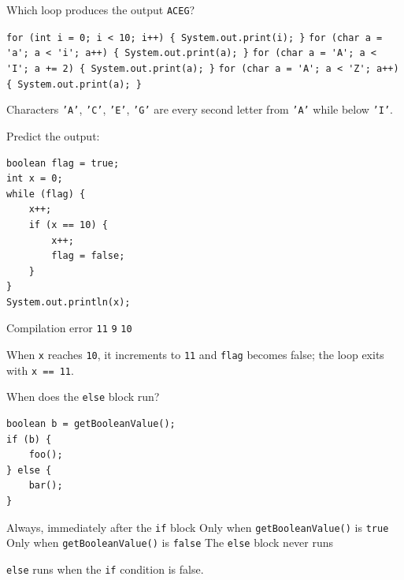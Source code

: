 \newpage

\question[4]
Which loop produces the output \lstinline!ACEG!?
\begin{choices}
  \choice \lstinline!for (int i = 0; i < 10; i++) { System.out.print(i); }!
  \choice \lstinline!for (char a = 'a'; a < 'i'; a++) { System.out.print(a); }!
  \CorrectChoice \lstinline!for (char a = 'A'; a < 'I'; a += 2) { System.out.print(a); }!
  \choice \lstinline!for (char a = 'A'; a < 'Z'; a++) { System.out.print(a); }!
\end{choices}
\begin{solution}
  Characters \texttt{'A'}, \texttt{'C'}, \texttt{'E'}, \texttt{'G'} are every second letter from \texttt{'A'} while below \texttt{'I'}.
\end{solution}

\question[4]
Predict the output:
\begin{lstlisting}[style=java]
boolean flag = true;
int x = 0;
while (flag) {
    x++;
    if (x == 10) {
        x++;
        flag = false;
    }
}
System.out.println(x);
\end{lstlisting}
\begin{choices}
  \choice Compilation error
  \CorrectChoice \texttt{11}
  \choice \texttt{9}
  \choice \texttt{10}
\end{choices}
\begin{solution}
  When \texttt{x} reaches \texttt{10}, it increments to \texttt{11} and \texttt{flag} becomes false; the loop exits with \texttt{x == 11}.
\end{solution}

\question[4]
When does the \texttt{else} block run?
\begin{lstlisting}[style=java]
boolean b = getBooleanValue();
if (b) {
    foo();
} else {
    bar();
}
\end{lstlisting}
\begin{choices}
  \choice Always, immediately after the \texttt{if} block
  \choice Only when \lstinline!getBooleanValue()! is \lstinline!true!
  \CorrectChoice Only when \lstinline!getBooleanValue()! is \lstinline!false!
  \choice The \texttt{else} block never runs
\end{choices}
\begin{solution}
  \texttt{else} runs when the \texttt{if} condition is false.
\end{solution}

\newpage


